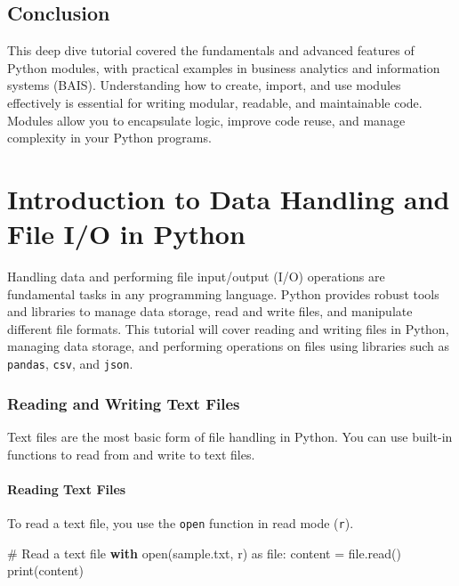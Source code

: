 \documentclass[
  letterpaper,
  DIV=11,
  numbers=noendperiod]{scrreprt}
\newenvironment{Shaded}{\begin{snugshade}}{\end{snugshade}}
\newcommand{\BuiltInTok}[1]{\textcolor[rgb]{0.00,0.23,0.31}{#1}}
\newcommand{\CommentTok}[1]{\textcolor[rgb]{0.37,0.37,0.37}{#1}}
\newcommand{\ControlFlowTok}[1]{\textcolor[rgb]{0.00,0.23,0.31}{\textbf{#1}}}
\newcommand{\ImportTok}[1]{\textcolor[rgb]{0.00,0.46,0.62}{#1}}
\newcommand{\NormalTok}[1]{\textcolor[rgb]{0.00,0.23,0.31}{#1}}
\newcommand{\OperatorTok}[1]{\textcolor[rgb]{0.37,0.37,0.37}{#1}}
\newcommand{\StringTok}[1]{\textcolor[rgb]{0.13,0.47,0.30}{#1}}
\begin{document}
\section{Conclusion}\label{conclusion-7}

This deep dive tutorial covered the fundamentals and advanced features
of Python modules, with practical examples in business analytics and
information systems (BAIS). Understanding how to create, import, and use
modules effectively is essential for writing modular, readable, and
maintainable code. Modules allow you to encapsulate logic, improve code
reuse, and manage complexity in your Python programs.


\chapter{Introduction to Data Handling and File I/O in
Python}\label{introduction-to-data-handling-and-file-io-in-python}

Handling data and performing file input/output (I/O) operations are
fundamental tasks in any programming language. Python provides robust
tools and libraries to manage data storage, read and write files, and
manipulate different file formats. This tutorial will cover reading and
writing files in Python, managing data storage, and performing
operations on files using libraries such as \texttt{pandas},
\texttt{csv}, and \texttt{json}.

\subsection{Reading and Writing Text
Files}\label{reading-and-writing-text-files}

Text files are the most basic form of file handling in Python. You can
use built-in functions to read from and write to text files.

\subsubsection{Reading Text Files}\label{reading-text-files}

To read a text file, you use the \texttt{open} function in read mode
(\texttt{\textquotesingle{}r\textquotesingle{}}).

\begin{Shaded}
\begin{Highlighting}[]
\CommentTok{\# Read a text file}
\ControlFlowTok{with} \BuiltInTok{open}\NormalTok{(}\StringTok{\textquotesingle{}sample.txt\textquotesingle{}}\NormalTok{, }\StringTok{\textquotesingle{}r\textquotesingle{}}\NormalTok{) }\ImportTok{as} \BuiltInTok{file}\NormalTok{:}
\NormalTok{    content }\OperatorTok{=} \BuiltInTok{file}\NormalTok{.read()}
    \BuiltInTok{print}\NormalTok{(content)}
\end{Highlighting}
\end{Shaded}
\end{document}
